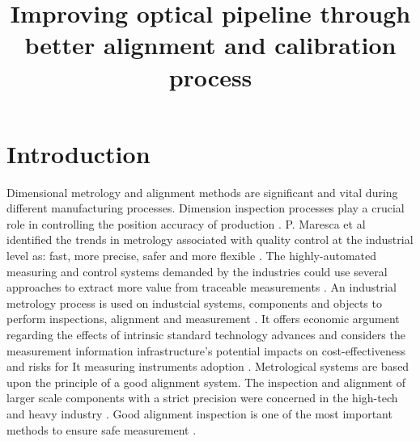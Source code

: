 \documentclass[10pt,a4paper,onecolumn]{article}
\begin{document}
	\title{Improving optical pipeline through better alignment and calibration process} 

\maketitle	
  \section{Introduction}
  \label{intro}
  Dimensional metrology and alignment methods are significant and vital during different
  manufacturing processes. Dimension inspection processes play a crucial role in controlling
  the position accuracy of production \cite{gu2020study}. P. Maresca et al identified the
  trends in metrology associated with quality control at the industrial level as: fast, more
  precise, safer and more flexible \cite{maresca2019evaluation}. The highly-automated
  measuring and control systems demanded by the industries could use several approaches to
  extract more value from traceable measurements \cite{hall2019opportunity}. An industrial
  metrology process is used on industcial systems, components and objects to perform
  inspections, alignment and measurement \cite{moru202@machine}. It offers economic argument
  regarding the effects of intrinsic standard technology advances and considers the
  measurement information infrastructure's potential impacts on cost-effectiveness and risks
  for It measuring instruments adoption \cite{kuster2020measurement}. Metrological systems
  are based upon the principle of a good alignment system. The inspection and alignment of
  larger scale components with a strict precision were concerned in the high-tech and heavy
  industry \cite{gu202@study}. Good alignment inspection is one of the most important
  methods to ensure safe measurement \cite{peng2020inertial}.
  \newpage
  
  
  
\end{document}
